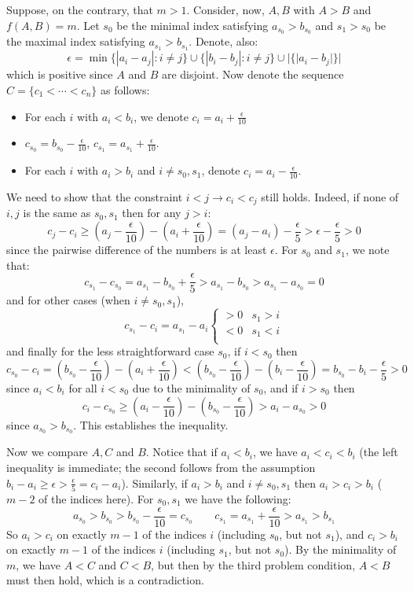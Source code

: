 \documentclass[11pt,a4paper]{article}
\begin{document}
\begin{enumerate}
	Suppose, on the contrary, that $m>1$. Consider, now, $A, B$ with $A>B$ and $f(A, B)=m$. Let $s_0$ be the minimal index satisfying $a_{s_0} > b_{s_0}$ and $s_1>s_0$ be the maximal index satisfying $a_{s_1} > b_{s_1}$. Denote, also: 
	\[
	\epsilon = \min\{|a_i-a_j|: i\neq j\}\cup \{|b_i-b_j|: i\neq j\}\cup |\{|a_i-b_j|\}|
	\]
	which is positive since $A$ and $B$ are disjoint. 
	Now denote the sequence $C=\{c_1<\cdots < c_n\}$ as follows: 
	\begin{itemize}
		\item For each $i$ with $a_i<b_i$, we denote $c_i=a_i+\frac{\epsilon}{10}$
		\item $c_{s_0}=b_{s_0}-\frac{\epsilon}{10}$, $c_{s_1}=a_{s_1}+\frac{\epsilon}{10}$. 
		\item For each $i$ with $a_i>b_i$ and $i\neq s_0, s_1$, denote $c_i=a_i-\frac{\epsilon}{10}$. 
	\end{itemize}
	We need to show that the constraint $i<j\to c_i<c_j$ still holds. Indeed, if none of $i, j$ is the same as $s_0, s_1$ then for any $j>i$: 
	\[
	c_j-c_i \ge (a_j - \frac{\epsilon}{10})-(a_i + \frac{\epsilon}{10})= (a_j-a_i)-\frac{\epsilon}{5} > \epsilon - \frac{\epsilon}{5} > 0
	\]
	since the pairwise difference of the numbers is at least $\epsilon$. 
	For $s_0$ and $s_1$, we note that: 
	\[
	c_{s_1}-c_{s_0}= a_{s_1}-b_{s_0} + \frac{\epsilon}{5} > a_{s_1} - b_{s_0} > a_{s_1} - a_{s_0} = 0
	\]
	and for other cases (when $i\neq s_0, s_1$), 
	\[
	c_{s_1}-c_i = a_{s_1} - a_i\begin{cases}
	 > 0 & s_1 > i\\
	 < 0 & s_1 < i\\
	\end{cases}
	\]
	and finally for the less straightforward case $s_0$, if $i<s_0$ then 
	\[
	c_{s_0} - c_i = (b_{s_0} - \frac{\epsilon}{10}) - (a_i + \frac{\epsilon}{10}) < (b_{s_0} - \frac{\epsilon}{10}) - (b_i - \frac{\epsilon}{10}) = b_{s_0} - b_i - \frac{\epsilon}{5} > 0
	\]
	since $a_i<b_i$ for all $i<s_0$ due to the minimality of $s_0$, and if $i>s_0$ then 
	\[
	c_i-c_{s_0} \ge (a_i - \frac{\epsilon}{10}) - (b_{s_0} - \frac{\epsilon}{10}) > a_i - a_{s_0} > 0
	\]
	since $a_{s_0} > b_{s_0}$. This establishes the inequality. 
	
	Now we compare $A, C$ and $B$. Notice that if $a_i<b_i$, we have $a_i<c_i<b_i$ (the left inequality is immediate; the second follows from the assumption $b_i-a_i\ge \epsilon > \frac{\epsilon}{5} = c_i-a_i$). Similarly, if $a_i>b_i$ and $i\neq s_0, s_1$ then $a_i>c_i>b_i$ ($m-2$ of the indices here). For $s_0, s_1$ we have the following: 
	\[
	a_{s_0} > b_{s_0} > b_{s_0} - \frac{\epsilon}{10} = c_{s_0}\qquad 
	c_{s_1} = a_{s_1} + \frac{\epsilon}{10} > a_{s_1} > b_{s_1}
	\]
	So $a_i>c_i$ on exactly $m-1$ of the indices $i$ (including $s_0$, but not $s_1$), and $c_i>b_i$ on exactly $m-1$ of the indices $i$ (including $s_1$, but not $s_0$). By the minimality of $m$, we have $A<C$ and $C<B$, but then by the third problem condition, $A<B$ must then hold, which is a contradiction. 
	

\end{enumerate}
\end{document}
